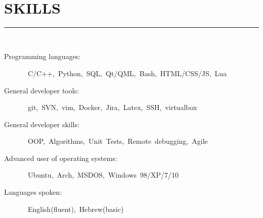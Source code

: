 \documentclass[a4paper,oneside,12pt]{article}
\newcommand{\cvpart}[1]{%
\vspace{-1em}%
\section*{\large\bfseries\MakeTextUppercase{#1}}%
\vspace{-1em}%
\rule{\linewidth}{0.3em}\\[-.3em]%
}
\begin{document}
~\\

\cvpart{Skills}
\begin{description}
\item[Programming languages:]~C/C++,~Python,~SQL,~Qt/QML,~Bash,~HTML/CSS/JS,~Lua
\item[General developer tools:]~git,~SVN,~vim,~Docker,~Jira,~Latex,~SSH,~virtualbox
\item[General developer skills:]~OOP,~Algorithms,~Unit~Tests,~Remote~debugging,~Agile
\item[Advanced user of operating systems:]~Ubuntu,~Arch,~MSDOS,~Windows~98/XP/7/10
\item[Languages spoken:]~English(fluent),~Hebrew(basic)

\end{description}
\end{document}
